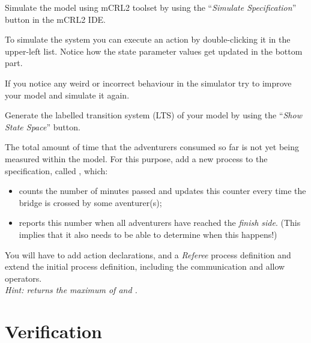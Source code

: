 \documentclass[11pt]{article}
\theoremstyle{myplain}
\theoremstyle{definition} %
\begin{document}
 
\bigskip
\begin{exercise}
Simulate the model using mCRL2 toolset by using the ``\emph{Simulate Specification}'' button in the mCRL2 IDE.
%

To simulate the system you can execute an action by double-clicking it in the upper-left list. Notice how the state parameter values get updated in the bottom part.

If you notice any weird or incorrect behaviour in the simulator try to improve your model and simulate it again.
\end{exercise}


\bigskip
\begin{exercise}
  Generate the labelled transition system (LTS) of your model by using the ``\emph{Show State Space}'' button.
\end{exercise}


\bigskip
\begin{exercise}
The total amount of time that the adventurers consumed so far is not yet being measured within the model. For this purpose, add a new process to the specification, called , which:
\begin{itemize}
  \item counts the number of minutes passed and updates this counter every time the bridge is crossed by some aventurer(s);
  \item reports this number when all adventurers have reached the \emph{finish side}. (This implies that it also needs to be able to determine when this happens!)
\end{itemize}
You will have to add action declarations, and a \emph{Referee} process definition and extend the initial process definition, including the communication and allow operators.\\[1mm]
\emph{Hint:  returns the maximum of  and .} 
\end{exercise}


\section*{Verification}
\end{document}
